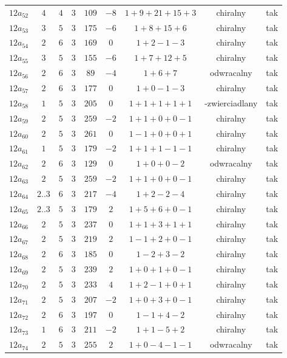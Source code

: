 \begin{longtable}{ccccccccc}
$12a_{52}$ & $4$ & $4$ & $3$ & $109$ & $-8$ & $1+9+21+15+3$ & chiralny & tak \\
$12a_{53}$ & $3$ & $5$ & $3$ & $175$ & $-6$ & $1+8+15+6$ & chiralny & tak \\
$12a_{54}$ & $2$ & $6$ & $3$ & $169$ & $0$ & $1+2-1-3$ & chiralny & tak \\
$12a_{55}$ & $3$ & $5$ & $3$ & $155$ & $-6$ & $1+7+12+5$ & chiralny & tak \\
$12a_{56}$ & $2$ & $6$ & $3$ & $89$ & $-4$ & $1+6+7$ & odwracalny & tak \\
$12a_{57}$ & $2$ & $6$ & $3$ & $177$ & $0$ & $1+0-1-3$ & chiralny & tak \\
$12a_{58}$ & $1$ & $5$ & $3$ & $205$ & $0$ & $1+1+1+1+1$ & -zwierciadlany & tak \\
$12a_{59}$ & $2$ & $5$ & $3$ & $259$ & $-2$ & $1+1+0+0-1$ & chiralny & tak \\
$12a_{60}$ & $2$ & $5$ & $3$ & $261$ & $0$ & $1-1+0+0+1$ & chiralny & tak \\
$12a_{61}$ & $1$ & $5$ & $3$ & $179$ & $-2$ & $1+1+1-1-1$ & chiralny & tak \\
$12a_{62}$ & $2$ & $6$ & $3$ & $129$ & $0$ & $1+0+0-2$ & odwracalny & tak \\
$12a_{63}$ & $2$ & $5$ & $3$ & $259$ & $-2$ & $1+1+0+0-1$ & chiralny & tak \\
$12a_{64}$ & $2..3$ & $6$ & $3$ & $217$ & $-4$ & $1+2-2-4$ & chiralny & tak \\
$12a_{65}$ & $2..3$ & $5$ & $3$ & $179$ & $2$ & $1+5+6+0-1$ & chiralny & tak \\
$12a_{66}$ & $2$ & $5$ & $3$ & $237$ & $0$ & $1+1+3+1+1$ & chiralny & tak \\
$12a_{67}$ & $2$ & $5$ & $3$ & $219$ & $2$ & $1-1+2+0-1$ & chiralny & tak \\
$12a_{68}$ & $2$ & $6$ & $3$ & $185$ & $0$ & $1-2+3-2$ & chiralny & tak \\
$12a_{69}$ & $2$ & $5$ & $3$ & $239$ & $2$ & $1+0+1+0-1$ & chiralny & tak \\
$12a_{70}$ & $2$ & $5$ & $3$ & $233$ & $4$ & $1+2-1+0+1$ & chiralny & tak \\
$12a_{71}$ & $2$ & $5$ & $3$ & $207$ & $-2$ & $1+0+3+0-1$ & chiralny & tak \\
$12a_{72}$ & $2$ & $6$ & $3$ & $197$ & $0$ & $1-1+4-2$ & chiralny & tak \\
$12a_{73}$ & $1$ & $6$ & $3$ & $211$ & $-2$ & $1+1-5+2$ & chiralny & tak \\
$12a_{74}$ & $2$ & $5$ & $3$ & $255$ & $2$ & $1+0-4-1-1$ & odwracalny & tak \\

\end{longtable}
